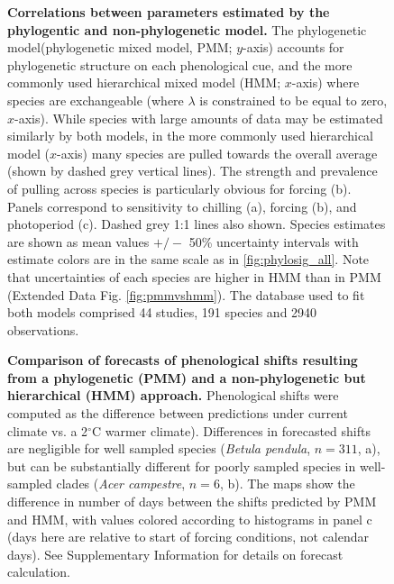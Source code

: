 \documentclass[11pt]{article}
\begin{document}
\begin{figure} [h!]
  \caption{\textbf{Correlations between parameters estimated by the phylogentic and non-phylogenetic model.} The phylogenetic model(phylogenetic mixed model, PMM; $y$-axis) accounts for phylogenetic structure on each phenological cue, and the more commonly used hierarchical mixed model (HMM; $x$-axis) where species are exchangeable (where $\lambda$ is constrained to be equal to zero, $x$-axis). While species with large amounts of data may be estimated similarly by both models, in the more commonly used hierarchical model ($x$-axis) many species are pulled towards the overall average (shown by dashed grey vertical lines). The strength and prevalence of pulling across species is particularly obvious for forcing (b). Panels correspond to sensitivity to chilling (a), forcing (b), and photoperiod (c). Dashed grey 1:1 lines also shown. Species estimates are shown as mean values $+/-$ 50\% uncertainty intervals with estimate colors are in the same scale as in \ref{fig:phylosig_all}. Note that uncertainties of each species are higher in HMM than in PMM (Extended Data Fig. \ref{fig:pmmvshmm}). The database used to fit both models comprised 44 studies, 191 species and 2940 observations.}
  \label{fig:correls_angio}
\end{figure}

\begin{figure} [h!]
  \caption{\textbf{Comparison of forecasts of phenological shifts resulting from a phylogenetic (PMM) and a non-phylogenetic but hierarchical (HMM) approach.} Phenological shifts were computed as the difference between predictions under current climate vs. a 2$^{\circ}$C warmer climate). Differences in forecasted shifts are negligible for well sampled species (\emph{Betula pendula}, $n = 311$, a), but can be substantially different for poorly sampled species in well-sampled clades (\emph{Acer campestre}, $n = 6$, b). The maps show the difference in number of days between the shifts predicted by PMM and HMM, with values colored according to histograms in panel c (days here are relative to start of forcing conditions, not calendar days). See Supplementary Information for details on forecast calculation.}
  \label{fig:forecast}
\end{figure}
\end{document}
